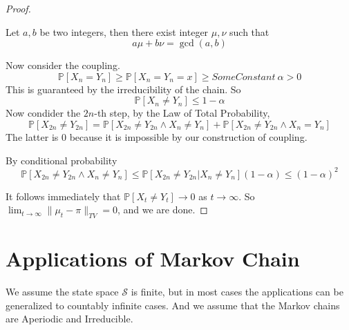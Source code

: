 \begin{proof}
        \begin{lemma}\label{theorem:Bezout}
            Let $a,b$ be two integers, then there exist integer $\mu, \nu$ such that
            \[ a\mu + b\nu = \gcd(a,b) \]
        \end{lemma}

        Now consider the coupling.
        \[ \mathbb{P}[X_n = Y_n] \ge \mathbb{P}[X_n=Y_n=x] \ge SomeConstant~{} \alpha > 0 \]
        This is guaranteed by the irreducibility of the chain.
        So
        \[ \mathbb{P}[X_n \neq Y_n] \le 1 - \alpha \]
        Now condider the $2n$-th step, by the Law of Total Probability,
        \[ \mathbb{P}[X_{2n} \neq Y_{2n}] = \mathbb{P}[X_{2n} \neq Y_{2n} \wedge X_n \neq Y_n] + \mathbb{P}[X_{2n} \neq Y_{2n} \wedge X_n = Y_n] \]
        The latter is $0$ because it is impossible by our construction of coupling.
        
        By conditional probability
        \[ \mathbb{P}[X_{2n} \neq Y_{2n} \wedge X_n \neq Y_n] \le \mathbb{P}[X_{2n} \neq Y_{2n} | X_n \neq Y_n](1-\alpha) \le (1-\alpha)^2 \]

        It follows immediately that $\mathbb{P}[X_t \neq Y_t] \to 0$ as $t \to \infty$. So $\lim_{t\to\infty}\|\mu_t - \pi\|_{TV} = 0$, and we are done.
    \end{proof}


\section{Applications of Markov Chain}
    We assume the state space $\mathcal{S}$ is finite, but in most cases the applications can be generalized to countably infinite cases. And we assume that the Markov chains are Aperiodic and Irreducible.

